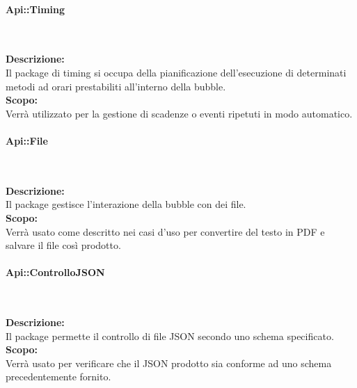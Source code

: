 \begin{samepage}
\paragraph{Api::Timing}\label{api-timing}\mbox{}\\
\end{samepage}
\textbf{Descrizione:}\\
Il package di timing si occupa della pianificazione dell'esecuzione di determinati metodi ad orari prestabiliti all'interno della bubble.\\
\textbf{Scopo:}\\
Verrà utilizzato per la gestione di scadenze o eventi ripetuti in modo automatico.

\begin{samepage}
\paragraph{Api::File}\label{api-file}\mbox{}\\
\end{samepage}
\textbf{Descrizione:}\\ 
Il package gestisce l'interazione della bubble con dei file.\\ 
\textbf{Scopo:}\\
Verrà usato come descritto nei casi d’uso per convertire del testo in PDF e salvare il file così prodotto.

\begin{samepage}
\paragraph{Api::ControlloJSON}\label{api-json}\mbox{}\\
\end{samepage}
\textbf{Descrizione:}\\ 
Il package permette il controllo di file JSON secondo uno schema specificato.\\ 
\textbf{Scopo:}\\
Verrà usato per verificare che il JSON prodotto sia conforme ad uno schema precedentemente fornito.

